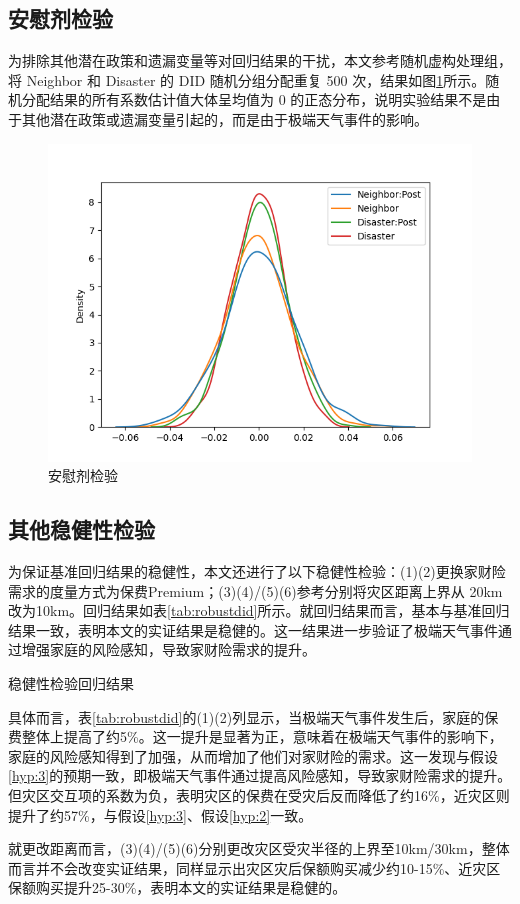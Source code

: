 \subsection{安慰剂检验}
为排除其他潜在政策和遗漏变量等对回归结果的干扰，本文参考\citet{CYJJ202104009}随机虚构处理组，将 Neighbor 和 Disaster 的 DID 随机分组分配重复 500 次，结果如图\ref{fig:randomtest}所示。随机分配结果的所有系数估计值大体呈均值为 0 的正态分布，说明实验结果不是由于其他潜在政策或遗漏变量引起的，而是由于极端天气事件的影响。
\begin{figure}[H]
    \includegraphics[width=\linewidth]{lib/img/randomtest.png}
    \caption{安慰剂检验}\label{fig:randomtest}
\end{figure}

\subsection{其他稳健性检验}

为保证基准回归结果的稳健性，本文还进行了以下稳健性检验：(1)(2)更换家财险需求的度量方式为保费Premium；(3)(4)/(5)(6)参考\citet{alok2020fund}分别将灾区距离上界从 20km 改为10km。回归结果如表\ref{tab:robustdid}所示。就回归结果而言，基本与基准回归结果一致，表明本文的实证结果是稳健的。这一结果进一步验证了极端天气事件通过增强家庭的风险感知，导致家财险需求的提升。
\begin{table}
    \centering
    \caption{稳健性检验回归结果}\label{tab:robustdid}
    
\end{table}

具体而言，表\ref{tab:robustdid}的(1)(2)列显示，当极端天气事件发生后，家庭的保费整体上提高了约5\%。这一提升是显著为正，意味着在极端天气事件的影响下，家庭的风险感知得到了加强，从而增加了他们对家财险的需求。这一发现与假设\ref{hyp:3}的预期一致，即极端天气事件通过提高风险感知，导致家财险需求的提升。但灾区交互项的系数为负，表明灾区的保费在受灾后反而降低了约16\%，近灾区则提升了约57\%，与假设\ref{hyp:3}、假设\ref{hyp:2}一致。

就更改距离而言，(3)(4)/(5)(6)分别更改灾区受灾半径的上界至10km/30km，整体而言并不会改变实证结果，同样显示出灾区灾后保额购买减少约10-15\%、近灾区保额购买提升25-30\%，表明本文的实证结果是稳健的。
